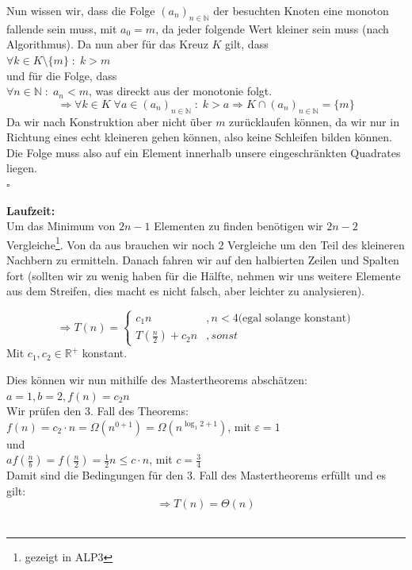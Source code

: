 \documentclass[11pt,a4paper,ngerman]{article}
\begin{document}
\begin{enumerate}[\bfseries (a)]
Nun wissen wir, dass die Folge $(a_n)_{n \in \mathbb{N}}$ der besuchten Knoten eine monoton fallende sein muss, mit $a_0 = m$, da jeder folgende Wert kleiner sein muss (nach Algorithmus). Da nun aber für das Kreuz $K$ gilt, dass\\
$\forall k \in K \setminus \{m\} \; : \; k > m$\\
und für die Folge, dass\\
$\forall n \in \mathbb{N} \; : \; a_n < m$, was direckt aus der monotonie folgt.
$$
\Rightarrow \forall k \in K \; \forall a \in (a_n)_{n \in \mathbb{N}} \; : \; k > a \Rightarrow K \cap (a_n)_{n \in \mathbb{N}} = \{m\}
$$
Da wir nach Konstruktion aber nicht über $m$ zurücklaufen können, da wir nur in Richtung eines echt kleineren gehen können, also keine Schleifen bilden können. Die Folge muss also auf ein Element innerhalb unsere eingeschränkten Quadrates liegen.\\
\mbox{} \hfill $\square$

\textbf{Laufzeit:}\\
Um das Minimum von $2n-1$ Elementen zu finden benötigen wir $2n-2$ Vergleiche\footnote{gezeigt in ALP3}. Von da aus brauchen wir noch 2 Vergleiche um den Teil des kleineren Nachbern zu ermitteln. Danach fahren wir auf den halbierten Zeilen und Spalten fort (sollten wir zu wenig haben für die Hälfte, nehmen wir uns weitere Elemente aus dem Streifen, dies macht es nicht falsch, aber leichter zu analysieren).

$$
\Rightarrow T(n) = \left\{
\begin{array}{lr}
c_1 n &, n < 4 \text{(egal solange konstant)}\\
T(\frac{n}{2}) + c_2 n &, sonst
\end{array}
\right.
$$
Mit $c_1, c_2 \in \mathbb{R}^+$ konstant.
\end{enumerate}

Dies können wir nun mithilfe des Mastertheorems abschätzen:\\
$a=1, b=2, f(n) = c_2 n$\\
Wir prüfen den 3. Fall des Theorems:\\
$f(n) = c_2 \cdot n = \Omega (n^{0 + 1})= \Omega (n^{\log_1 2 + 1})$, mit $\varepsilon = 1$\\
und\\
$a f(\frac{n}{b}) = f(\frac{n}{2}) = \frac{1}{2}n \leq c \cdot n$, mit $c = \frac{3}{4}$\\
Damit sind die Bedingungen für den 3. Fall des Mastertheorems erfüllt und es gilt:
$$
\Rightarrow T(n) = \Theta ( n)  
$$\\
\end{document}
